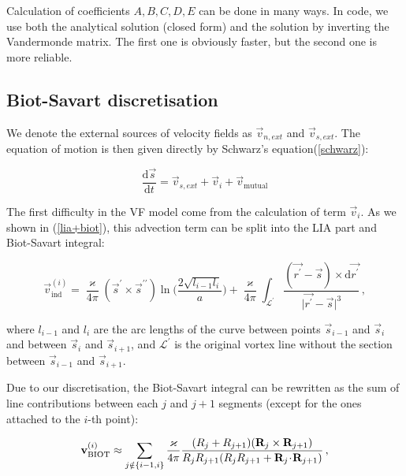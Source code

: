 Calculation of coefficients $A, B, C, D, E$ can be done in many ways. In code, we use both the analytical solution (closed form) and the solution by inverting the Vandermonde matrix. The first one is obviously faster, but the second one is more reliable.


\subsection*{Biot-Savart discretisation}

We denote the external sources of velocity fields as $\vec{v}_{n,ext}$ and $\vec{v}_{s,ext}$. The equation of motion is then given directly by Schwarz's equation(\ref{schwarz}):

\begin{equation}
\frac{\text{d}\vec{s}}{\text{d}t} =
\vec{v}_{s,ext} + \vec{v}_i + \vec{v}_{\text{mutual}}
\end{equation}

The first difficulty in the VF model come from the calculation of term $\vec{v}_i$. As we shown in (\ref{lia+biot}), this advection term can be split into the LIA part and Biot-Savart integral:

\begin{equation}
\vec{v}_{\text{ind}}^{(i)} =
\frac{\varkappa}{4\pi} (\vec{s}^{\prime} \times \vec{s}^{\prime \prime})
\ln{\Big(\frac{2\sqrt{l_{i-1} l_i}}{a}\Big)}
+ \frac{\varkappa}{4\pi} \int_{\mathcal{L}^{\prime}} \frac{(\vec{r^{\prime}} - \vec{s}) \times \text{d}\vec{r^{\prime}}}{\vert \vec{r^{\prime}} - \vec{s} \vert^3}\,,
\end{equation}

where $l_{i-1}$ and $l_i$ are the arc lengths of the curve between
points $\vec{s}_{i-1}$ and $\vec{s}_i$ and between $\vec{s}_i$ and $\vec{s}_{i+1}$, and $\mathcal{L}^{\prime}$ is the original vortex line without the section between $\vec{s}_{i-1}$ and $\vec{s}_{i+1}$.

Due to our discretisation, the Biot-Savart integral can be rewritten as the sum of line contributions between each $j$ and $j+1$ segments (except for the ones attached to the $i$-th point):

\begin{equation}
\mathbf{v}_{\text{BIOT}}^{(i)} \approx
\sum_{j \notin \{i-1, i\}}
\frac{\varkappa}{4\pi}
\frac{(R_j + R_{j+1}) (\mathbf{R}_j \times \mathbf{R}_{j+1})}{R_j R_{j+1} (R_j R_{j+1} + \mathbf{R}_j \!\cdot\! \mathbf{R}_{j+1})}\,,
\end{equation}


